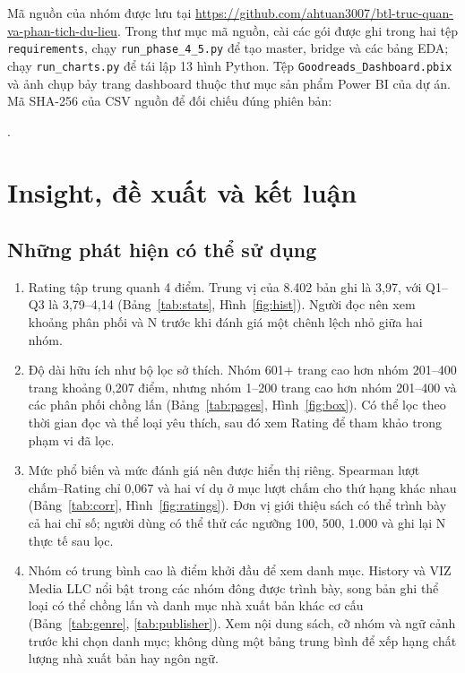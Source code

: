 \documentclass[11pt,a4paper]{article}
\begin{document}
Mã nguồn của nhóm được lưu tại \url{https://github.com/ahtuan3007/btl-truc-quan-va-phan-tich-du-lieu}. Trong thư mục mã nguồn, cài các gói được ghi trong hai tệp \texttt{requirements}, chạy \texttt{run\_phase\_4\_5.py} để tạo master, bridge và các bảng EDA; chạy \texttt{run\_charts.py} để tái lập 13 hình Python. Tệp \texttt{Goodreads\_Dashboard.pbix} và ảnh chụp bảy trang dashboard thuộc thư mục sản phẩm Power BI của dự án. Mã SHA-256 của CSV nguồn để đối chiếu đúng phiên bản: \par{}.

\section{Insight, đề xuất và kết luận}
\subsection{Những phát hiện có thể sử dụng}
\begin{enumerate}
  \item Rating tập trung quanh 4 điểm. Trung vị của 8.402 bản ghi là 3,97, với Q1–Q3 là 3,79–4,14 (Bảng~\ref{tab:stats}, Hình~\ref{fig:hist}). Người đọc nên xem khoảng phân phối và N trước khi đánh giá một chênh lệch nhỏ giữa hai nhóm.
  \item Độ dài hữu ích như bộ lọc sở thích. Nhóm 601+ trang cao hơn nhóm 201–400 trang khoảng 0,207 điểm, nhưng nhóm 1–200 trang cao hơn nhóm 201–400 và các phân phối chồng lấn (Bảng~\ref{tab:pages}, Hình~\ref{fig:box}). Có thể lọc theo thời gian đọc và thể loại yêu thích, sau đó xem Rating để tham khảo trong phạm vi đã lọc.
  \item Mức phổ biến và mức đánh giá nên được hiển thị riêng. Spearman lượt chấm–Rating chỉ 0,067 và hai ví dụ ở mục lượt chấm cho thứ hạng khác nhau (Bảng~\ref{tab:corr}, Hình~\ref{fig:ratings}). Đơn vị giới thiệu sách có thể trình bày cả hai chỉ số; người dùng có thể thử các ngưỡng 100, 500, 1.000 và ghi lại N thực tế sau lọc.
  \item Nhóm có trung bình cao là điểm khởi đầu để xem danh mục. History và VIZ Media LLC nổi bật trong các nhóm đông được trình bày, song bản ghi thể loại có thể chồng lấn và danh mục nhà xuất bản khác cơ cấu (Bảng~\ref{tab:genre}, \ref{tab:publisher}). Xem nội dung sách, cỡ nhóm và ngữ cảnh trước khi chọn danh mục; không dùng một bảng trung bình để xếp hạng chất lượng nhà xuất bản hay ngôn ngữ.
\end{enumerate}
\end{document}

